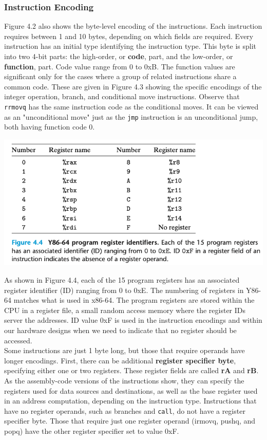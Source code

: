 \documentclass[11pt]{article}
\begin{document}
\subsubsection{Instruction Encoding}
\label{sec:org0329120}

Figure 4.2 also shows the byte-level encoding of the instructions. Each instruction requires between 1 and 10 bytes, depending on which fields are required. Every instruction has an initial type identifying the instruction type. This byte is split into two 4-bit parts: the high-order, or \textbf{code}, part, and the low-order, or \textbf{function}, part. Code value range from 0 to 0xB. The function values are significant only for the cases where a group of related instructions share a common code. These are given in Figure 4.3 showing the specific encodings of the integer operation, branch, and conditional move instructions. Observe that \texttt{rrmovq} has the same instruction code as the conditional moves. It can be viewed as an "unconditional move" just as the \texttt{jmp} instruction is an unconditional jump, both having function code 0.\\

\begin{center}
\includegraphics[width=.9\linewidth]{pics/figure4.4-y86-64-program-register-identifiers.png}
\end{center}

As shown in Figure 4.4, each of the 15 program registers has an associated register identifier (ID) ranging from 0 to 0xE. The numbering of registers in Y86-64 matches what is used in x86-64. The program registers are stored within the CPU in a register file, a small random access memory where the register IDs server the addresses. ID value 0xF is used in the instruction encodings and within our hardware designs when we need to indicate that no register should be accessed.\\

Some instructions are just 1 byte long, but those that require operands have longer encodings. First, there can be additional \textbf{register specifier byte}, specifying either one or two registers. These register fields are called \textbf{rA} and \textbf{rB}. As the assembly-code versions of the instructions show, they can specify the registers used for data sources and destinations, as well as the base register used in an address computation, depending on the instruction type. Instructions that have no register operands, such as branches and \texttt{call}, do not have a register specifier byte. Those that require just one register operand (irmovq, pushq, and popq) have the other register specifier set to value 0xF.\\
\end{document}
